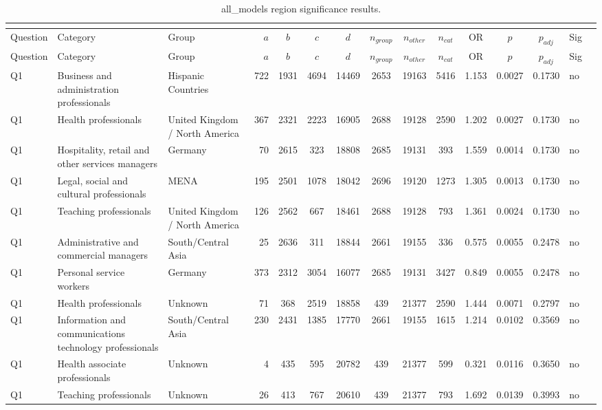 \begin{longtable}{lllrcccccccccll}
\caption{all_models region significance results.}\\
\label{tab:appendix-all_models-region}\\
\toprule
Question & Category & Group & $a$ & $b$ & $c$ & $d$ & $n_{group}$ & $n_{other}$ & $n_{cat}$ & OR & $p$ & $p_{adj}$ & Sig \\
\midrule
\endfirsthead
\toprule
Question & Category & Group & $a$ & $b$ & $c$ & $d$ & $n_{group}$ & $n_{other}$ & $n_{cat}$ & OR & $p$ & $p_{adj}$ & Sig \\
\midrule
\endhead
\midrule
\endfoot
\bottomrule
\endlastfoot
Q1 & Business and administration professionals & Hispanic Countries & 722 & 1931 & 4694 & 14469 & 2653 & 19163 & 5416 & 1.153 & 0.0027 & 0.1730 & no \\
Q1 & Health professionals & United Kingdom / North America & 367 & 2321 & 2223 & 16905 & 2688 & 19128 & 2590 & 1.202 & 0.0027 & 0.1730 & no \\
Q1 & Hospitality, retail and other services managers & Germany & 70 & 2615 & 323 & 18808 & 2685 & 19131 & 393 & 1.559 & 0.0014 & 0.1730 & no \\
Q1 & Legal, social and cultural professionals & MENA & 195 & 2501 & 1078 & 18042 & 2696 & 19120 & 1273 & 1.305 & 0.0013 & 0.1730 & no \\
Q1 & Teaching professionals & United Kingdom / North America & 126 & 2562 & 667 & 18461 & 2688 & 19128 & 793 & 1.361 & 0.0024 & 0.1730 & no \\
Q1 & Administrative and commercial managers & South/Central Asia & 25 & 2636 & 311 & 18844 & 2661 & 19155 & 336 & 0.575 & 0.0055 & 0.2478 & no \\
Q1 & Personal service workers & Germany & 373 & 2312 & 3054 & 16077 & 2685 & 19131 & 3427 & 0.849 & 0.0055 & 0.2478 & no \\
Q1 & Health professionals & Unknown & 71 & 368 & 2519 & 18858 & 439 & 21377 & 2590 & 1.444 & 0.0071 & 0.2797 & no \\
Q1 & Information and communications technology professionals & South/Central Asia & 230 & 2431 & 1385 & 17770 & 2661 & 19155 & 1615 & 1.214 & 0.0102 & 0.3569 & no \\
Q1 & Health associate professionals & Unknown & 4 & 435 & 595 & 20782 & 439 & 21377 & 599 & 0.321 & 0.0116 & 0.3650 & no \\
Q1 & Teaching professionals & Unknown & 26 & 413 & 767 & 20610 & 439 & 21377 & 793 & 1.692 & 0.0139 & 0.3993 & no \\

\end{longtable}
